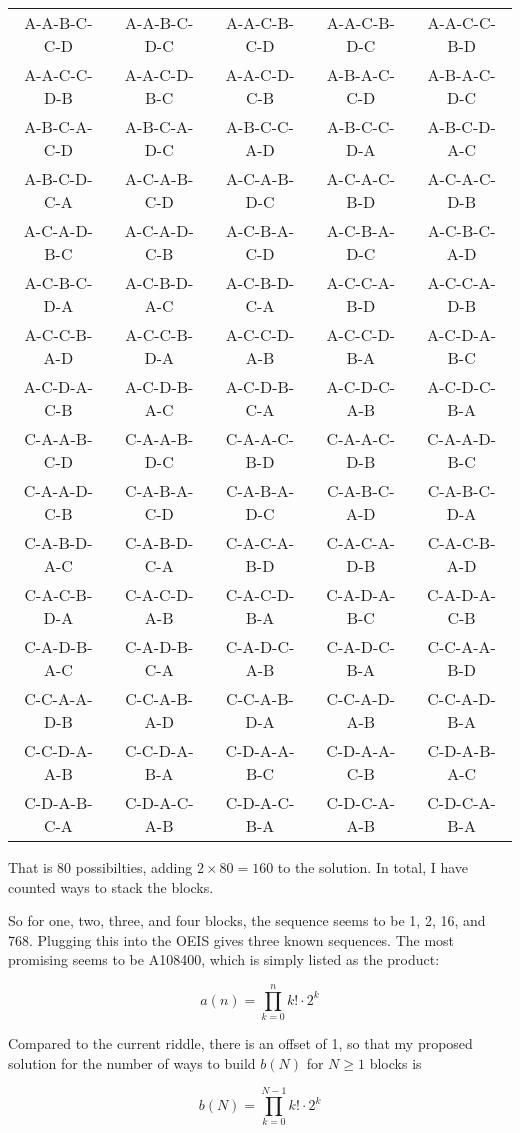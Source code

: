 \documentclass{article}
\begin{document}
\begin{center}
\begin{tabular}{ccccc}
A-A-B-C-C-D & A-A-B-C-D-C & A-A-C-B-C-D & A-A-C-B-D-C & A-A-C-C-B-D \\
A-A-C-C-D-B & A-A-C-D-B-C & A-A-C-D-C-B & A-B-A-C-C-D & A-B-A-C-D-C \\
A-B-C-A-C-D & A-B-C-A-D-C & A-B-C-C-A-D & A-B-C-C-D-A & A-B-C-D-A-C \\
A-B-C-D-C-A & A-C-A-B-C-D & A-C-A-B-D-C & A-C-A-C-B-D & A-C-A-C-D-B \\
A-C-A-D-B-C & A-C-A-D-C-B & A-C-B-A-C-D & A-C-B-A-D-C & A-C-B-C-A-D \\
A-C-B-C-D-A & A-C-B-D-A-C & A-C-B-D-C-A & A-C-C-A-B-D & A-C-C-A-D-B \\
A-C-C-B-A-D & A-C-C-B-D-A & A-C-C-D-A-B & A-C-C-D-B-A & A-C-D-A-B-C \\
A-C-D-A-C-B & A-C-D-B-A-C & A-C-D-B-C-A & A-C-D-C-A-B & A-C-D-C-B-A \\
C-A-A-B-C-D & C-A-A-B-D-C & C-A-A-C-B-D & C-A-A-C-D-B & C-A-A-D-B-C \\
C-A-A-D-C-B & C-A-B-A-C-D & C-A-B-A-D-C & C-A-B-C-A-D & C-A-B-C-D-A \\
C-A-B-D-A-C & C-A-B-D-C-A & C-A-C-A-B-D & C-A-C-A-D-B & C-A-C-B-A-D \\
C-A-C-B-D-A & C-A-C-D-A-B & C-A-C-D-B-A & C-A-D-A-B-C & C-A-D-A-C-B \\
C-A-D-B-A-C & C-A-D-B-C-A & C-A-D-C-A-B & C-A-D-C-B-A & C-C-A-A-B-D \\
C-C-A-A-D-B & C-C-A-B-A-D & C-C-A-B-D-A & C-C-A-D-A-B & C-C-A-D-B-A \\
C-C-D-A-A-B & C-C-D-A-B-A & C-D-A-A-B-C & C-D-A-A-C-B & C-D-A-B-A-C \\
C-D-A-B-C-A & C-D-A-C-A-B & C-D-A-C-B-A & C-D-C-A-A-B & C-D-C-A-B-A
\end{tabular}
\end{center}

That is 80 possibilties, adding $2\times80=160$ to the solution.
In total, I have counted
 ways to stack the blocks.

So for one, two, three, and four blocks, the sequence seems to be 1, 2, 16, and 768.
Plugging this into the OEIS gives three known sequences.
The most promising seems to be A108400, which is simply listed as the product:

\[
a(n)=\prod_{k=0}^{n}k!\cdot2^{k}
\]

Compared to the current riddle, there is an offset of 1, so that my proposed solution for the number of ways to build $b(N)$ for $N\geq1$ blocks is

\[
b(N)=\prod_{k=0}^{N-1}k!\cdot2^{k}
\]
\end{document}
